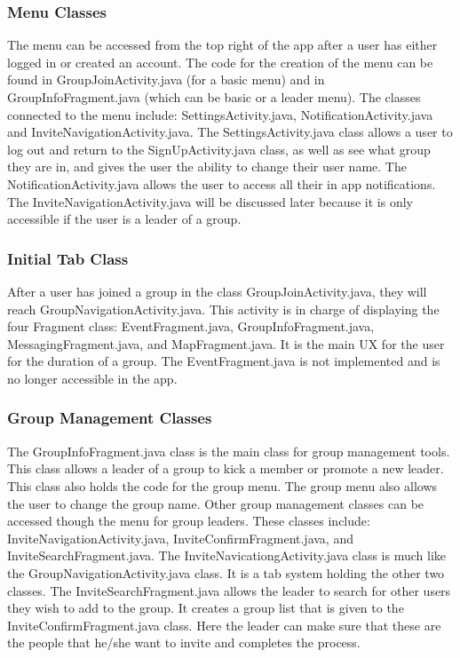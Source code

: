  	\subsubsection{Menu Classes}
 	The menu can be accessed from the top right of the app after a user has either logged in or created an account. The code for the creation of the menu can be found in GroupJoinActivity.java (for a basic menu) and in GroupInfoFragment.java (which can be basic or a leader menu). 
 	The classes connected to the menu include: SettingsActivity.java, NotificationActivity.java and InviteNavigationActivity.java.  The SettingsActivity.java class allows a user to log out and return to the SignUpActivity.java class, as well as see what group they are in, and gives the user the ability to change their user name. The NotificationActivity.java allows the user to access all their in app notifications. The InviteNavigationActivity.java will be discussed later because it is only accessible if the user is a leader of a group.
 	\subsubsection{Initial Tab Class}
 	After a user has joined a group in the class GroupJoinActivity.java, they will reach GroupNavigationActivity.java. This activity is in charge of displaying the four Fragment class: EventFragment.java, GroupInfoFragment.java, MessagingFragment.java, and MapFragment.java. It is the main UX for the user for the duration of a group.
 	The EventFragment.java is not implemented and is no longer accessible in the app.
 	\subsubsection{Group Management Classes}
 	The GroupInfoFragment.java class is the main class for group management tools. This class allows a leader of a group to kick a member or promote a new leader. This class also holds the code for the group menu. The group menu also allows the user to change the group name.
 	Other group management classes can be accessed though the menu for group leaders. These classes include: InviteNavigationActivity.java, InviteConfirmFragment.java, and InviteSearchFragment.java. The InviteNavicationgActivity.java class is much like the GroupNavigationActivity.java class. It is a tab system holding the other two classes. The InviteSearchFragment.java allows the leader to search for other users they wish to add to the group. It creates a group list that is given to the InviteConfirmFragment.java class. Here the leader can make sure that these are the people that he/she want to invite and completes the process.
